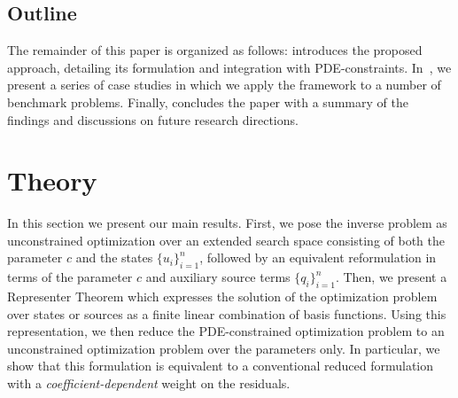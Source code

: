 \documentclass[12pt]{amsart}
\begin{document}
\subsection{Outline}
The remainder of this paper is organized as follows:  introduces the proposed approach, detailing its formulation and integration with PDE-constraints. In~, we present a series of case studies in which we apply the framework to a number of benchmark problems. Finally,  concludes the paper with a summary of the findings and discussions on future research directions.

\section{Theory}\label{sec:theory}
In this section we present our main results. First, we pose the inverse problem as unconstrained optimization over an extended search space consisting of both the parameter $c$ and the states $\{u_i\}_{i=1}^n$, followed by an equivalent reformulation in terms of the parameter $c$ and auxiliary source terms $\{q_i\}_{i=1}^n$. Then, we present a Representer Theorem which expresses the solution of the optimization problem over states or sources as a finite linear combination of basis functions. Using this representation, we then reduce the PDE-constrained optimization problem to an unconstrained optimization problem over the parameters only. In particular, we show that this formulation is equivalent to a conventional reduced formulation with a \textit{coefficient-dependent} weight on the residuals.
\end{document}
